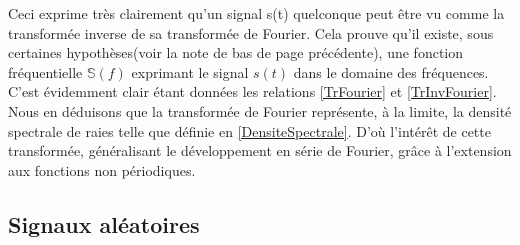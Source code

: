 Ceci exprime très clairement qu'un signal s(t) quelconque peut être vu comme la transformée inverse de sa transformée de Fourier. Cela prouve qu'il existe, sous certaines hypothèses(voir la note de bas de page précédente), une fonction fréquentielle $ \mathbb{S}(f) $ exprimant le signal $ s(t) $ dans le domaine des fréquences. C'est évidemment clair étant données les relations \ref{TrFourier} et \ref{TrInvFourier}.\\
Nous en déduisons que la transformée de Fourier représente, à la limite, la densité spectrale de raies telle que définie en \ref{DensiteSpectrale}.
D'où l'intérêt de cette transformée, généralisant le développement en série de Fourier, grâce à l'extension aux fonctions non périodiques.
\subsection{Signaux aléatoires}
